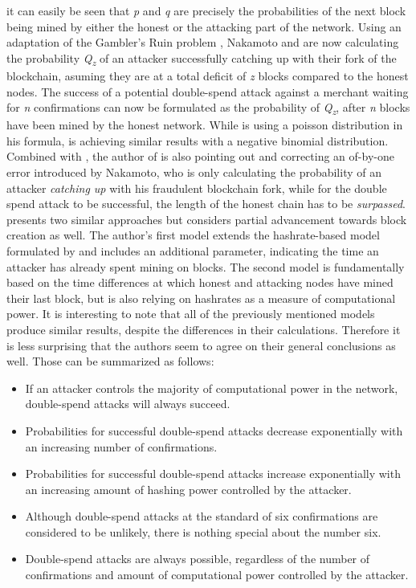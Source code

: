\documentclass[a4paper,12pt,twoside]{report}
\begin{document}
it can easily be seen that \textit{p} and \textit{q} are precisely the probabilities of the next block being mined by either the honest or the attacking part of the network. Using an adaptation of the Gambler's Ruin problem \cite{gamblersruin}, Nakamoto and \cite{HBDSA} are now calculating the probability \textit{Q\textsubscript{z}} of an attacker successfully catching up with their fork of the blockchain, asuming they are at a total deficit of \textit{z} blocks compared to the honest nodes. The success of a potential double-spend attack against a merchant waiting for \textit{n} confirmations can now be formulated as the probability of \textit{Q\textsubscript{z}}, after \textit{n} blocks have been mined by the honest network. While \cite{nakamoto2008bitcoin} is using a poisson distribution in his formula, \cite{HBDSA} is achieving similar results with a negative binomial distribution. Combined with \cite{NakamotoDSACorrection}, the author of \cite{HBDSA} is also pointing out and correcting an of-by-one error introduced by Nakamoto, who is only calculating the probability of an attacker \textit{catching up} with his fraudulent blockchain fork, while for the double spend attack to be successful, the length of the honest chain has to be \textit{surpassed}. \cite{DSAwithTime} presents two similar approaches but considers partial advancement towards block creation as well. The author's first model extends the hashrate-based model formulated by \cite{HBDSA} and includes an additional parameter, indicating the time an attacker has already spent mining on blocks. The second model is fundamentally based on the time differences at which honest and attacking nodes have mined their last block, but is also relying on hashrates as a measure of computational power.
It is interesting to note that all of the previously mentioned models produce similar results, despite the differences in their calculations. Therefore it is less surprising that the authors seem to agree on their general conclusions as well. Those can be summarized as follows:
\begin{itemize}
\item If an attacker controls the majority of computational power in the network, double-spend attacks will always succeed.
\item Probabilities for successful double-spend attacks decrease exponentially with an increasing number of confirmations.
\item Probabilities for successful double-spend attacks increase exponentially with an increasing amount of hashing power controlled by the attacker.
\item Although double-spend attacks at the standard of six confirmations are considered to be unlikely, there is nothing special about the number six.
\item Double-spend attacks are always possible, regardless of the number of confirmations and amount of computational power controlled by the attacker.
\end{itemize}
\end{document}
